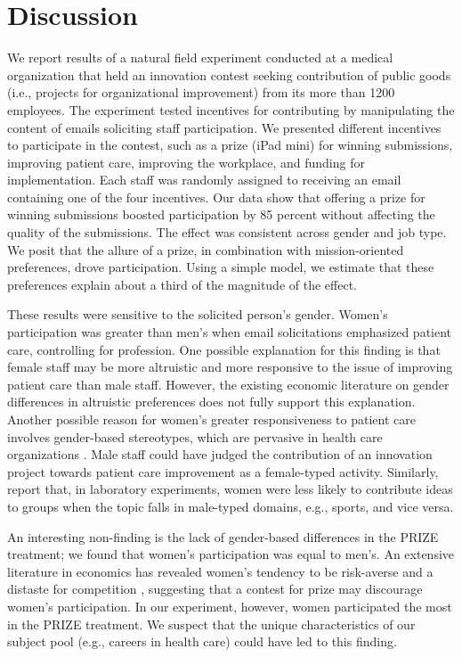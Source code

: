 \documentclass[12pt, titlepage]{article}
\begin{document}
\section{Discussion}\label{discussion}

We report results of a natural field experiment conducted at a medical
organization that held an innovation contest seeking contribution of
public goods (i.e., projects for organizational improvement) from its
more than 1200 employees. The experiment tested incentives for
contributing by manipulating the content of emails soliciting staff
participation. We presented different incentives to participate in the
contest, such as a prize (iPad mini) for winning submissions, improving
patient care, improving the workplace, and funding for implementation.
Each staff was randomly assigned to receiving an email containing one of
the four incentives. Our data show that offering a prize for winning
submissions boosted participation by 85 percent without affecting the
quality of the submissions. The effect was consistent across gender and
job type. We posit that the allure of a prize, in combination with
mission-oriented preferences, drove participation. Using a simple model,
we estimate that these preferences explain about a third of the
magnitude of the effect.

These results were sensitive to the solicited person's gender. Women's
participation was greater than men's when email solicitations emphasized
patient care, controlling for profession. One possible explanation for
this finding is that female staff may be more altruistic and more
responsive to the issue of improving patient care than male staff.
However, the existing economic literature on gender differences in
altruistic preferences \citep[see][]{croson2009gender} does not fully
support this explanation. Another possible reason for women's greater
responsiveness to patient care involves gender-based stereotypes, which
are pervasive in health care organizations \citep{evans2002cautious}.
Male staff could have judged the contribution of an innovation project
towards patient care improvement as a female-typed activity. Similarly,
\citet{coffman2014evidence} report that, in laboratory experiments,
women were less likely to contribute ideas to groups when the topic
falls in male-typed domains, e.g., sports, and vice versa.

An interesting non-finding is the lack of gender-based differences in
the PRIZE treatment; we found that women's participation was equal to
men's. An extensive literature in economics has revealed women's
tendency to be risk-averse \citep{borghans2009gender} and a distaste for
competition \citep{niederle2007women}, suggesting that a contest for
prize may discourage women's participation. In our experiment, however,
women participated the most in the PRIZE treatment. We suspect that the
unique characteristics of our subject pool (e.g., careers in health
care) could have led to this finding.
\end{document}
